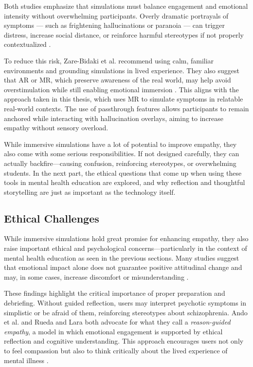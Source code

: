 Both studies emphasize that simulations must balance engagement and emotional intensity without overwhelming participants. Overly dramatic portrayals of symptoms — such as frightening hallucinations or paranoia — can trigger distress, increase social distance, or reinforce harmful stereotypes if not properly contextualized \cite{Ando2011, Chaffin2013, Zare-Bidaki2022}.

To reduce this risk, Zare-Bidaki et al. recommend using calm, familiar environments and grounding simulations in lived experience. They also suggest that AR or MR, which preserve awareness of the real world, may help avoid overstimulation while still enabling emotional immersion \cite{Zare-Bidaki2022}. This aligns with the approach taken in this thesis, which uses MR to simulate symptoms in relatable real-world contexts. The use of passthrough features allows participants to remain anchored while interacting with hallucination overlays, aiming to increase empathy without sensory overload.

\vspace{1em}

While immersive simulations have a lot of potential to improve empathy, they also come with some serious responsibilities. If not designed carefully, they can actually backfire—causing confusion, reinforcing stereotypes, or overwhelming students. In the next part, the ethical questions that come up when using these tools in mental health education are explored, and why reflection and thoughtful storytelling are just as important as the technology itself.

\subsection{Ethical Challenges}
\label{sec:ethicalchallenges}

While immersive simulations hold great promise for enhancing empathy, they also raise important ethical and psychological concerns—particularly in the context of mental health education as seen in the previous sections. Many studies suggest that emotional impact alone does not guarantee positive attitudinal change and may, in some cases, increase discomfort or misunderstanding \cite{Ando2011}.

These findings highlight the critical importance of proper preparation and debriefing. Without guided reflection, users may interpret psychotic symptoms in simplistic or be afraid of them, reinforcing stereotypes about schizophrenia. Ando et al. and Rueda and Lara both advocate for what they call a \textit{reason-guided empathy}, a model in which emotional engagement is supported by ethical reflection and cognitive understanding. This approach encourages users not only to feel compassion but also to think critically about the lived experience of mental illness \cite{Ando2011, Rueda2020}. 

